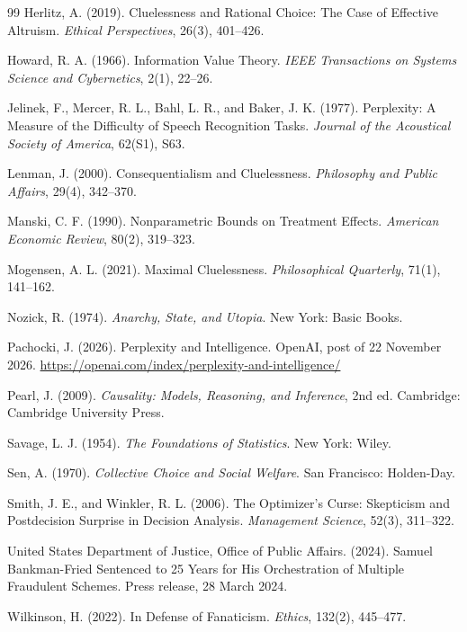 \documentclass[11pt]{article}
\theoremstyle{definition}
\theoremstyle{remark}
\begin{document}
\begin{thebibliography}{99}
Herlitz, A. (2019).
Cluelessness and Rational Choice: The Case of Effective Altruism.
\emph{Ethical Perspectives}, 26(3), 401--426.

Howard, R. A. (1966).
Information Value Theory.
\emph{IEEE Transactions on Systems Science and Cybernetics}, 2(1), 22--26.

Jelinek, F., Mercer, R. L., Bahl, L. R., and Baker, J. K. (1977).
Perplexity: A Measure of the Difficulty of Speech Recognition Tasks.
\emph{Journal of the Acoustical Society of America}, 62(S1), S63.

Lenman, J. (2000).
Consequentialism and Cluelessness.
\emph{Philosophy and Public Affairs}, 29(4), 342--370.

Manski, C. F. (1990).
Nonparametric Bounds on Treatment Effects.
\emph{American Economic Review}, 80(2), 319--323.

Mogensen, A. L. (2021).
Maximal Cluelessness.
\emph{Philosophical Quarterly}, 71(1), 141--162.

Nozick, R. (1974).
\emph{Anarchy, State, and Utopia}.
New York: Basic Books.

Pachocki, J. (2026).
Perplexity and Intelligence.
OpenAI, post of 22 November 2026.
\url{https://openai.com/index/perplexity-and-intelligence/}

Pearl, J. (2009).
\emph{Causality: Models, Reasoning, and Inference}, 2nd ed.
Cambridge: Cambridge University Press.

Savage, L. J. (1954).
\emph{The Foundations of Statistics}.
New York: Wiley.

Sen, A. (1970).
\emph{Collective Choice and Social Welfare}.
San Francisco: Holden-Day.

Smith, J. E., and Winkler, R. L. (2006).
The Optimizer's Curse: Skepticism and Postdecision Surprise in Decision Analysis.
\emph{Management Science}, 52(3), 311--322.

United States Department of Justice, Office of Public Affairs. (2024).
Samuel Bankman-Fried Sentenced to 25 Years for His Orchestration of Multiple Fraudulent Schemes.
Press release, 28 March 2024.

Wilkinson, H. (2022).
In Defense of Fanaticism.
\emph{Ethics}, 132(2), 445--477.

\end{thebibliography}
\end{document}
